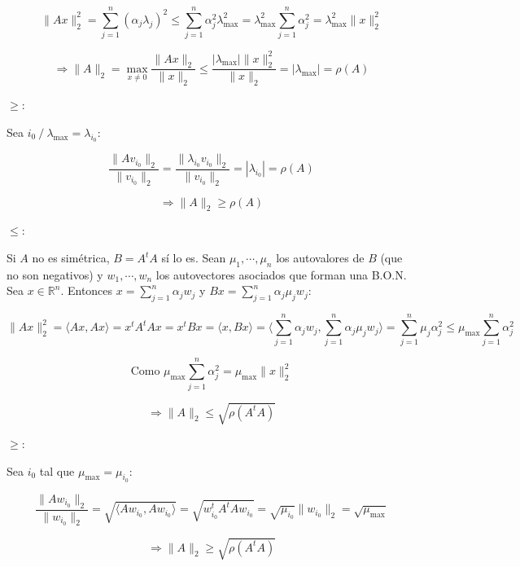 \begin{itemize}
	$$\|Ax\|_{2}^{2} = \sum \limits_{j = 1}^{n} (\alpha_{j}\lambda_{j})^{2} \leq \sum \limits_{j = 1}^{n} \alpha_{j}^{2}\lambda_{\max}^{2} = \lambda_{\max}^{2}\sum \limits_{j = 1}^{n} \alpha_{j}^{2} = \lambda_{\max}^{2}\|x\|_{2}^{2}$$
	
	$$\Rightarrow \|A\|_{2} = \max \limits_{x \neq 0} \frac{\|Ax\|_{2}}{\|x\|_{2}} \leq \frac{|\lambda_{\max}|\|x\|_{2}^{2}}{\|x\|_{2}} = |\lambda_{\max}| = \rho(A)$$
	
	$\geq$:
	
	Sea $i_{0}\ / \ \lambda_{\max} = \lambda_{i_{0}}$:
	
	$$\frac{\|Av_{i_{0}}\|_{2}}{\|v_{i_{0}}\|_{2}} = \frac{\|\lambda_{i_{0}}v_{i_{0}}\|_{2}}{\|v_{i_{0}}\|_{2}} = |\lambda_{i_{0}}| = \rho(A)$$
	
	$$\Rightarrow \|A\|_{2} \geq \rho(A)$$
	
	$\leq$:
	
	Si $A$ no es sim\'etrica, $B = A^{t}A$ s\'i lo es. Sean $\mu_{1}, \cdots, \mu_{n}$ los autovalores de $B$ (que no son negativos) y $w_{1}, \cdots, w_{n}$ los autovectores asociados que forman una B.O.N.\\
	
	Sea $x \in \mathbb{R}^{n}$. Entonces $x = \sum \limits_{j = 1}^{n} \alpha_{j}w_{j}$ y $Bx = \sum \limits_{j = 1}^{n} \alpha_{j}\mu_{j}w_{j}$:
	
	$$\|Ax\|_{2}^{2} = \langle Ax, Ax \rangle = x^{t}A^{t}Ax = x^{t}Bx = \langle x, Bx \rangle = \langle \sum \limits_{j = 1}^{n} \alpha_{j}w_{j}, \sum \limits_{j = 1}^{n} \alpha_{j}\mu_{j}w_{j} \rangle = \sum \limits_{j = 1}^{n} \mu_{j}\alpha_{j}^{2} \leq \mu_{\max}\sum \limits_{j = 1}^{n} \alpha_{j}^{2}$$
	
	$$\text{Como } \mu_{\max}\sum \limits_{j = 1}^{n} \alpha_{j}^{2} = \mu_{\max}\|x\|_{2}^{2}$$
	
	$$\Rightarrow \|A\|_{2} \leq \sqrt{\rho(A^{t}A)}$$
	
	$\geq$:
	
	Sea $i_{0}$ tal que $\mu_{\max} = \mu_{i_{0}}$:
	
	$$\frac{\|Aw_{i_{0}}\|_{2}}{\|w_{i_{0}}\|_{2}} = \sqrt{\langle Aw_{i_{0}}, Aw_{i_{0}} \rangle} = \sqrt{w_{i_{0}}^{t}A^{t}Aw_{i_{0}}} = \sqrt{\mu_{i_{0}}}\|w_{i_{0}}\|_{2} = \sqrt{\mu_{\max}}$$
	
	$$\Rightarrow \|A\|_{2} \geq \sqrt{\rho(A^{t}A)}$$
	
\end{itemize}